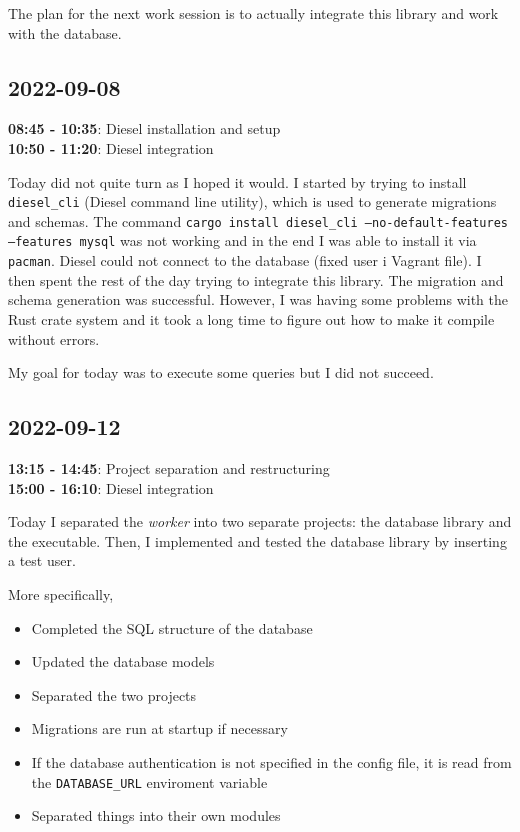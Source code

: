 \documentclass{article}
\begin{document}
The plan for the next work session is to actually integrate
this library and work with the database.

\pagebreak

\subsection{2022-09-08}

\textbf{08:45 - 10:35}: Diesel installation and setup \\
\textbf{10:50 - 11:20}: Diesel integration

Today did not quite turn as I hoped it would.
I started by trying to install \texttt{diesel\_cli} (Diesel command line utility),
which is used to generate migrations and schemas.
The command \texttt{cargo install diesel\_cli --no-default-features --features mysql}
was not working and in the end I was able to install it via \texttt{pacman}.
Diesel could not connect to the database (fixed user i Vagrant file).
I then spent the rest of the day trying to integrate this library.
The migration and schema generation was successful. However, I
was having some problems with the Rust crate system
and it took a long time to figure out how to make it compile without errors.

My goal for today was to execute some queries but I did not succeed.

\subsection{2022-09-12}

\textbf{13:15 - 14:45}: Project separation and restructuring \\
\textbf{15:00 - 16:10}: Diesel integration

Today I separated the \textit{worker} into two separate projects:
the database library and the executable. Then, I implemented and tested
the database library by inserting a test user.

More specifically,
\begin{itemize}
    \item Completed the SQL structure of the database
    \item Updated the database models
    \item Separated the two projects
    \item Migrations are run at startup if necessary
    \item If the database authentication is not specified in the config file,
        it is read from the \texttt{DATABASE\_URL} enviroment variable
    \item Separated things into their own modules
\end{itemize}
\end{document}

